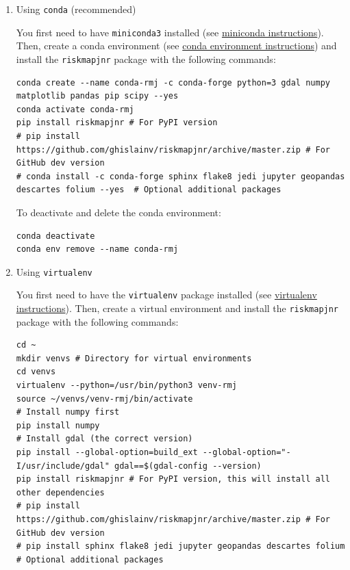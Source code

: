 \documentclass[paper=a4, 12pt, DIV=12]{scrartcl}
\begin{document}
\begin{enumerate}
\item Using \texttt{conda} (recommended)
\label{sec:org942f560}

You first need to have \texttt{miniconda3} installed (see \href{https://docs.conda.io/en/latest/miniconda.html}{miniconda instructions}). Then, create a conda environment (see \href{https://docs.conda.io/projects/conda/en/latest/user-guide/tasks/manage-environments.html}{conda environment instructions}) and install the \texttt{riskmapjnr} package with the following commands:

\begin{verbatim}
conda create --name conda-rmj -c conda-forge python=3 gdal numpy matplotlib pandas pip scipy --yes
conda activate conda-rmj
pip install riskmapjnr # For PyPI version
# pip install https://github.com/ghislainv/riskmapjnr/archive/master.zip # For GitHub dev version
# conda install -c conda-forge sphinx flake8 jedi jupyter geopandas descartes folium --yes  # Optional additional packages
\end{verbatim}

To deactivate and delete the conda environment:

\begin{verbatim}
conda deactivate
conda env remove --name conda-rmj
\end{verbatim}

\item Using \texttt{virtualenv}
\label{sec:org59e4a50}

You first need to have the \texttt{virtualenv} package installed (see \href{https://packaging.python.org/guides/installing-using-pip-and-virtual-environments/}{virtualenv instructions}). Then, create a virtual environment and install the \texttt{riskmapjnr} package with the following commands:

\begin{verbatim}
cd ~
mkdir venvs # Directory for virtual environments
cd venvs
virtualenv --python=/usr/bin/python3 venv-rmj
source ~/venvs/venv-rmj/bin/activate
# Install numpy first
pip install numpy
# Install gdal (the correct version) 
pip install --global-option=build_ext --global-option="-I/usr/include/gdal" gdal==$(gdal-config --version)
pip install riskmapjnr # For PyPI version, this will install all other dependencies
# pip install https://github.com/ghislainv/riskmapjnr/archive/master.zip # For GitHub dev version
# pip install sphinx flake8 jedi jupyter geopandas descartes folium # Optional additional packages
\end{verbatim}


\end{enumerate}
\end{document}
